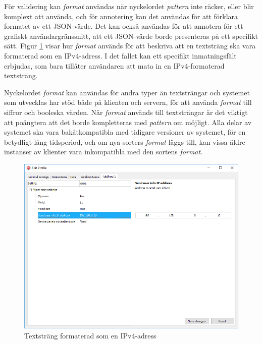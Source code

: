 För validering kan \textit{format} användas när nyckelordet \textit{pattern} inte räcker, eller blir komplext att använda, och för annotering kan det användas för att förklara formatet av ett JSON-värde. Det kan också användas för att annotera för ett grafiskt användargränssnitt, att ett JSON-värde borde presenteras på ett specifikt sätt. Figur \ref{fig:textstrang-ip-format} visar hur \textit{format} används för att beskriva att en textsträng ska vara formaterad som en IPv4-adress. I det fallet kan ett specifikt inmatningsfält erbjudas, som bara tillåter användaren att mata in en IPv4-formaterad textsträng.

Nyckelordet \textit{format} kan användas för andra typer än textsträngar och systemet som utvecklas har stöd både på klienten och servern, för att använda \textit{format} till siffror och booleska värden. När \textit{format} används till textsträngar är det viktigt att poängtera att det borde kompletteras med \textit{pattern} om möjligt. Alla delar av systemet ska vara bakåtkompatibla med tidigare versioner av systemet, för en betydligt lång tidsperiod, och om nya sorters \textit{format} läggs till, kan vissa äldre instanser av klienter vara inkompatibla med den sortens \textit{format}.

\begin{figure}
	\includegraphics[width=\textwidth]{./images/gui/textstrang-ip.png}
	\vspace{-1.7em}
	\caption{Textsträng formaterad som en IPv4-adress}
	\label{fig:textstrang-ip-format}
\end{figure}


